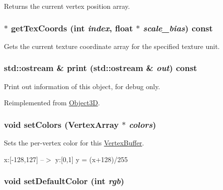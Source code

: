 Returns the current vertex position array. \hypertarget{classm3g_1_1VertexBuffer_9015840c09da0691c31a8aab5e09404a}{
\subsubsection[{getTexCoords}]{ $\ast$ getTexCoords (int {\em index}, \/  float $\ast$ {\em scale\_\-bias}) const}}
\label{classm3g_1_1VertexBuffer_9015840c09da0691c31a8aab5e09404a}


Gets the current texture coordinate array for the specified texture unit. \hypertarget{classm3g_1_1VertexBuffer_6fea17fa1532df3794f8cb39cb4f911f}{
\subsubsection[{print}]{\setlength{\rightskip}{0pt plus 5cm}std::ostream \& print (std::ostream \& {\em out}) const}}
\label{classm3g_1_1VertexBuffer_6fea17fa1532df3794f8cb39cb4f911f}


Print out information of this object, for debug only. 

Reimplemented from \hyperlink{classm3g_1_1Object3D_6fea17fa1532df3794f8cb39cb4f911f}{Object3D}.\hypertarget{classm3g_1_1VertexBuffer_e5a5933252e3ec3afa0a83698b5b3521}{
\subsubsection[{setColors}]{\setlength{\rightskip}{0pt plus 5cm}void setColors ({\bf VertexArray} $\ast$ {\em colors})}}
\label{classm3g_1_1VertexBuffer_e5a5933252e3ec3afa0a83698b5b3521}


Sets the per-vertex color for this \hyperlink{classm3g_1_1VertexBuffer}{VertexBuffer}.

x:\mbox{[}-128,127\mbox{]} --$>$ y:\mbox{[}0,1\mbox{]} y = (x+128)/255 \hypertarget{classm3g_1_1VertexBuffer_ba88996ea63221b09b9f841aef0270ee}{
\subsubsection[{setDefaultColor}]{\setlength{\rightskip}{0pt plus 5cm}void setDefaultColor (int {\em rgb})}}
\label{classm3g_1_1VertexBuffer_ba88996ea63221b09b9f841aef0270ee}


